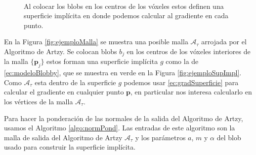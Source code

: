 \begin{figure}[htp]
\begin{center}
    \\
  \end{center}
  \caption[Ejemplo de colocación de lo blobs para visualización]{Al colocar los blobs en los centros de los vóxeles estos definen una superficie implícita en donde podemos calcular al gradiente en cada punto.}
  \label{fig:ejemploNS}
\end{figure}

En la Figura \ref{fig:ejemploMalla} se muestra una posible malla $\mathcal{A}_{\tau}$ arrojada por el Algoritmo de Artzy. Se colocan blobs $b_j$ en los centros de los vóxeles interiores de la malla $\{\textbf{p}_j\}$ estos forman una superficie implícita $g$ como la de \eqref{ec:modeloBlobby}, que se muestra en verde en la Figura \ref{fig:ejemploSupImpl}. Como $\mathcal{A}_{\tau}$ esta dentro de la superficie $g$ podemos usar \eqref{ec:gradSuperficie} para calcular el gradiente en cualquier punto $\textbf{p}$, en particular nos interesa calcularlo en los vértices de la malla $\mathcal{A}_{\tau}$.

Para hacer la ponderación de las normales de la salida del Algoritmo de Artzy, usamos el Algoritmo \ref{algo:normPond}. Las entradas de este algoritmo son la malla de salida del Algoritmo de Artzy $\mathcal{A}_{\tau}$ y los parámetros $a$, $m$ y $\alpha$ del blob usado para construir la superficie implícita.

